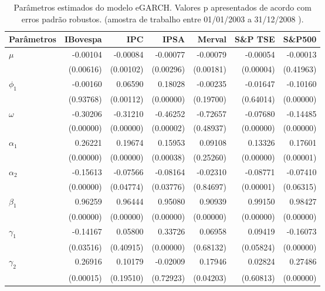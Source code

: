 \begin{table}[H]
\centering
\caption{Par\^ametros estimados do modelo eGARCH. Valores p apresentados de acordo 
com erros padrão robustos. (amostra de trabalho entre 01/01/2003 a 31/12/2008 ).} 
\label{tab:garchcoef}
\begin{tabular}{lrrrrrr}
  \hline
Parâmetros & IBovespa & IPC & IPSA & Merval & S\&P TSE & S\&P500 \\ 
  \hline
$\mu$ & -0.00104 & -0.00084 & -0.00077 & -0.00079 & -0.00054 & -0.00013 \\ 
   & (0.00616) & (0.00102) & (0.00296) & (0.00181) & (0.00004) & (0.41963) \\ 
  $\phi_1$ & -0.00160 & 0.06590 & 0.18028 & -0.00235 & -0.01647 & -0.10160 \\ 
   & (0.93768) & (0.00112) & (0.00000) & (0.19700) & (0.64014) & (0.00000) \\ 
  $\omega$ & -0.30206 & -0.31210 & -0.46252 & -0.72657 & -0.07680 & -0.14485 \\ 
   & (0.00000) & (0.00000) & (0.00002) & (0.48937) & (0.00000) & (0.00000) \\ 
  $\alpha_1$ & 0.26221 & 0.19674 & 0.15953 & 0.09108 & 0.13326 & 0.17601 \\ 
   & (0.00000) & (0.00000) & (0.00038) & (0.25260) & (0.00000) & (0.00001) \\ 
  $\alpha_2$ & -0.15613 & -0.07566 & -0.08164 & -0.02310 & -0.08771 & -0.07410 \\ 
   & (0.00000) & (0.04774) & (0.03776) & (0.84697) & (0.00001) & (0.06315) \\ 
  $\beta_1$ & 0.96259 & 0.96444 & 0.95080 & 0.90939 & 0.99150 & 0.98427 \\ 
   & (0.00000) & (0.00000) & (0.00000) & (0.00000) & (0.00000) & (0.00000) \\ 
  $\gamma_1$ & -0.14167 & 0.05800 & 0.33726 & 0.06958 & 0.09419 & -0.16073 \\ 
   & (0.03516) & (0.40915) & (0.00000) & (0.68132) & (0.05824) & (0.00000) \\ 
  $\gamma_2$ & 0.26916 & 0.10179 & -0.02009 & 0.17946 & 0.02824 & 0.27486 \\ 
   & (0.00015) & (0.19510) & (0.72923) & (0.04203) & (0.60813) & (0.00000) \\ 
   \hline
\end{tabular}
\end{table}
